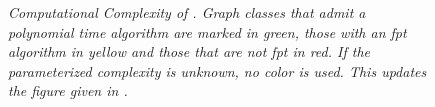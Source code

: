 \begin{figure}
    \centering
    \resizebox{1.0\textwidth}{!}{
        
    }
    \caption{\textit{Computational Complexity of \sdom. Graph classes that admit a polynomial time algorithm are marked in \textit{green}, those with an fpt algorithm in \textit{yellow} and those that are not fpt in \textit{red}. If the parameterized complexity is unknown, no color is used. This updates the figure given in \cite{Galby2020}.}}
    
    \label{fig:kernelization}
\end{figure}

